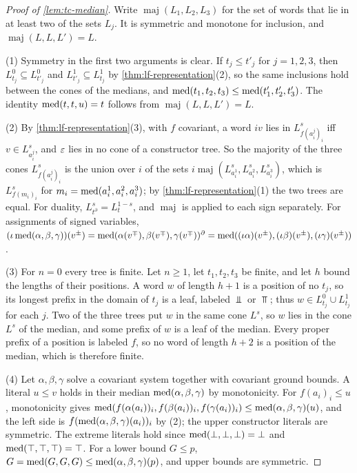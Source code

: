 \begin{proof}[Proof of \cref{lem:tc-median}]
Write $\operatorname{maj}(L_1,L_2,L_3)$ for the set of words that lie in at
least two of the sets $L_j$. It is symmetric and monotone for inclusion, and
$\operatorname{maj}(L,L,L')=L$.

(1) Symmetry in the first two arguments is clear. If $t_j\le t'_j$ for $j=1,2,3$, then
$L^0_{t_j}\subseteq L^0_{t'_j}$ and $L^1_{t'_j}\subseteq L^1_{t_j}$ by
\cref{thm:lf-representation}(2), so the same inclusions hold between the
cones of the medians, and $\operatorname{med}(t_1,t_2,t_3)\le\operatorname{med}(t'_1,t'_2,t'_3)$. The
identity $\operatorname{med}(t,t,u)=t$ follows from $\operatorname{maj}(L,L,L')=L$.

(2) By \cref{thm:lf-representation}(3), with $f$ covariant, a word $iv$ lies
in $L^s_{f(a^j_i)_i}$ iff $v\in L^s_{a^j_i}$, and $\varepsilon$ lies in no cone of a
constructor tree. So the majority of the three cones $L^s_{f(a^j_i)_i}$ is the
union over $i$ of the sets
$i\operatorname{maj}(L^s_{a^1_i},L^s_{a^2_i},L^s_{a^3_i})$, which is
$L^s_{f(m_i)_i}$ for $m_i=\operatorname{med}(a^1_i,a^2_i,a^3_i)$; by
\cref{thm:lf-representation}(1) the two trees are equal. For duality,
$L^s_{t^\partial}=L^{1-s}_t$, and $\operatorname{maj}$ is applied to each sign
separately. For assignments of signed variables,
$(\iota\operatorname{med}(\alpha,\beta,\gamma))(v^\pm)=\operatorname{med}(\alpha(v^\mp),\beta(v^\mp),\gamma(v^\mp))^\partial
=\operatorname{med}((\iota\alpha)(v^\pm),(\iota\beta)(v^\pm),(\iota\gamma)(v^\pm))$.

(3) For $n=0$ every tree is finite. Let $n\ge1$, let $t_1,t_2,t_3$ be finite,
and let $h$ bound the lengths of their positions. A word $w$ of length $h+1$
is a position of no $t_j$, so its longest prefix in the domain of $t_j$ is a
leaf, labeled $\Bot$ or $\Top$; thus $w\in L^0_{t_j}\cup L^1_{t_j}$ for each
$j$. Two of the three trees put $w$ in the same cone $L^s$, so $w$ lies in the
cone $L^s$ of the median, and some prefix of $w$ is a leaf of the median.
Every proper prefix of a position is labeled $f$, so no word of length $h+2$
is a position of the median, which is therefore finite.

(4) Let $\alpha,\beta,\gamma$ solve a covariant system together with covariant
ground bounds. A literal $u\le v$ holds in their median $\operatorname{med}(\alpha,\beta,\gamma)$
by monotonicity. For $f(a_i)_i\le u$, monotonicity gives
$\operatorname{med}(f(\alpha(a_i))_i,f(\beta(a_i))_i,f(\gamma(a_i))_i)\le
\operatorname{med}(\alpha,\beta,\gamma)(u)$, and the left side is
$f(\operatorname{med}(\alpha,\beta,\gamma)(a_i))_i$ by (2); the upper constructor literals are
symmetric. The extreme literals hold since $\operatorname{med}(\bot,\bot,\bot)=\bot$ and
$\operatorname{med}(\top,\top,\top)=\top$. For a lower bound $G\le p$,
$G=\operatorname{med}(G,G,G)\le\operatorname{med}(\alpha,\beta,\gamma)(p)$, and upper bounds are
symmetric.
\end{proof}


